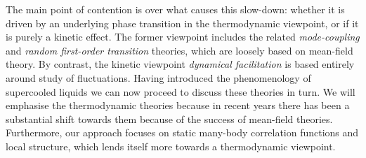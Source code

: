 \documentclass[11pt,twoside]{report}
\begin{document}

The main point of contention is over what causes this slow-down: whether it is driven by an underlying phase transition in the thermodynamic viewpoint, or if it is purely a kinetic effect.
The former viewpoint includes the related \emph{mode-coupling} and \emph{random first-order transition} theories, which are loosely based on mean-field theory.
By contrast, the kinetic viewpoint \emph{dynamical facilitation} is based entirely around study of fluctuations.
Having introduced the phenomenology of supercooled liquids we can now proceed to discuss these theories in turn.
We will emphasise the thermodynamic theories because in recent years there has been a substantial shift towards them because of the success of mean-field theories.
Furthermore, our approach focuses on static many-body correlation functions and local structure, which lends itself more towards a thermodynamic viewpoint.




\end{document}
